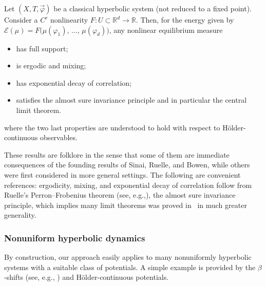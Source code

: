 \documentclass[10pt]{amsart}
\theoremstyle{definition}\newtheorem{defi}[theo]{Definition}\newtheorem{rema}[theo]{Remark}\newtheorem{exam}[theo]{Example}\newtheorem{exem}[theo]{Example}\newtheorem{nota}[theo]{Notation}
\theoremstyle{plain}
\theoremstyle{plain}
\newcommand{\pot}{\varphi}
\newcommand*\8{\infty}
\newcommand\RR{\mathbb{R}}
\newcommand{\En}{\mathcal{E}}
\begin{document}
\begin{coro}[Folklore]\label{cor-individual}
Let $(X,T,\vec\pot)$ be a classical hyperbolic system (not reduced to a fixed point). Consider a $C^r$ nonlinearity $F:U\subset\RR^d\to\RR$. Then, for the energy given by $\En(\mu) = F\big(\mu(\pot_1),\,\dots,\,\mu(\pot_d)\big)$, any nonlinear equilibrium measure
\begin{itemize}
\item has full support;
\item is ergodic and mixing;
\item has exponential decay of correlation;
\item satisfies the almost sure invariance principle and in particular the central limit theorem.
\end{itemize}
where the two last properties are understood to hold with respect to H\"older-con\-ti\-nuous observables.
\end{coro}

These results are folklore in the sense that some of them are immediate consequences of the founding results of Sinai, Ruelle, and Bowen, while others were first considered in more general settings. The following are convenient references: ergodicity, mixing, and exponential decay of correlation follow from Ruelle's Perron--Frobenius theorem (see, e.g.,\cite[chapter~1]{Baladi-book}), the almost sure invariance principle, which implies many limit theorems was proved in~\cite{MN05} in much greater generality.


\subsubsection{Nonuniform hyperbolic dynamics}

By construction, our approach easily applies to many nonuniformly hyperbolic systems with a suitable class of potentials. A simple example is provided by the $\beta$-shifts (see, e.g., \cite{Reniy-1957}) and H\"older-continuous potentials.
\end{document}
